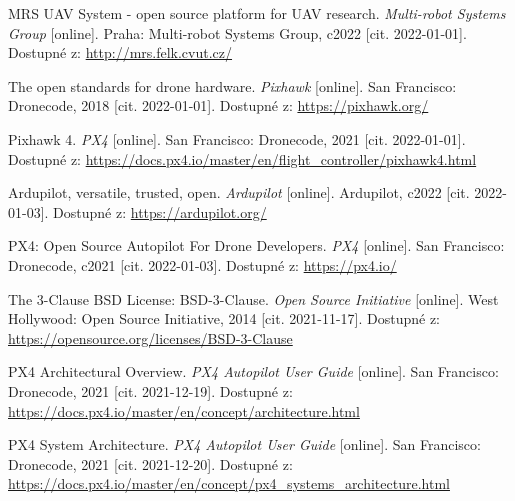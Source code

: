 

\begin{thebibliography}{99}

MRS UAV System - open source platform for UAV research. \textit{Multi-robot Systems Group} [online]. Praha: Multi-robot Systems Group, c2022 [cit. 2022-01-01]. Dostupné z: \href{http://mrs.felk.cvut.cz/}{http://mrs.felk.cvut.cz/}

The open standards for drone hardware. \textit{Pixhawk} [online]. San Francisco: Dronecode, 2018 [cit. 2022-01-01]. Dostupné z: \href{https://pixhawk.org/}{https://pixhawk.org/}

Pixhawk 4. \textit{PX4} [online]. San Francisco: Dronecode, 2021 [cit. 2022-01-01]. Dostupné z: \href{https://docs.px4.io/master/en/flight\_controller/pixhawk4.html}{https://docs.px4.io/master/en/flight\_controller/pixhawk4.html}

Ardupilot, versatile, trusted, open. \textit{Ardupilot} [online]. Ardupilot, c2022 [cit. 2022-01-03]. Dostupné z: \href{https://ardupilot.org/}{https://ardupilot.org/}

PX4: Open Source Autopilot For Drone Developers. \textit{PX4} [online]. San Francisco: Dronecode, c2021 [cit. 2022-01-03]. Dostupné z: \href{https://px4.io/}{https://px4.io/}

The 3-Clause BSD License: BSD-3-Clause. \textit{Open Source Initiative} [online]. West Hollywood: Open Source Initiative, 2014 [cit. 2021-11-17]. Dostupné z: \href{https://opensource.org/licenses/BSD-3-Clause}{https://opensource.org/licenses/BSD-3-Clause}

PX4 Architectural Overview. \textit{PX4 Autopilot User Guide} [online]. San Francisco: Dronecode, 2021 [cit. 2021-12-19]. Dostupné z: \href{https://docs.px4.io/master/en/concept/architecture.html}{https://docs.px4.io/master/en/concept/architecture.html}

PX4 System Architecture. \textit{PX4 Autopilot User Guide} [online]. San Francisco: Dronecode, 2021 [cit. 2021-12-20]. Dostupné z: \href{https://docs.px4.io/master/en/concept/px4\_systems\_architecture.html}{https://docs.px4.io/master/en/concept/px4\_systems\_architecture.html}


\end{thebibliography}
